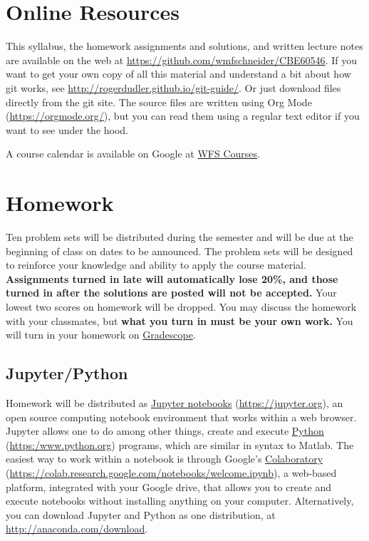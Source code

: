 \documentclass[11pt]{article}
\begin{document}
\section{Online Resources}
\label{sec:orgce3b4d6}
This syllabus, the homework assignments and solutions, and written lecture notes are available on the web at \url{https://github.com/wmfschneider/CBE60546}.  If you want to get your own copy of all this material and understand a bit about how git works, see \url{http://rogerdudler.github.io/git-guide/}.  Or just download files directly from the git site. The source files are written using Org Mode (\url{https://orgmode.org/}), but you can read them using a regular text editor if you want to see under the hood.

A course calendar is available on Google at \href{https://calendar.google.com/calendar/b/1?cid=NWJwN2pmMjI5bTdoYmFvM2R0cXM2NjYzOThAZ3JvdXAuY2FsZW5kYXIuZ29vZ2xlLmNvbQ}{WFS Courses}.
\section{Homework}
\label{sec:org49f998b}
Ten problem sets will be distributed during the semester and will be due at the beginning of class on dates to be announced. The problem sets will be designed to reinforce your knowledge and ability to apply the course material.  \textbf{Assignments turned in late will automatically lose 20\%, and those turned in after the solutions are posted will not be accepted.}  Your lowest two scores on homework will be dropped.  You may discuss the homework with your classmates, but \textbf{what you turn in must be your own work.} You will turn in your homework on \href{https://www.gradescope.com/courses/933965}{Gradescope}.
\subsection{Jupyter/Python}
\label{sec:org235db4b}
Homework will be distributed as \href{https://jupyter.org/}{Jupyter notebooks} (\url{https://jupyter.org}), an open source computing notebook environment that works within a web browser. Jupyter allows one to do among other things, create and execute \href{https://www.python.org/}{Python} (\url{https:/www.python.org}) programs, which are similar in syntax to Matlab. The easiest way to work within a notebook is through Google's \href{https://colab.research.google.com/notebooks/welcome.ipynb}{Colaboratory} (\url{https://colab.research.google.com/notebooks/welcome.ipynb}), a web-based platform, integrated with your Google drive, that allows you to create and execute notebooks without installing anything on your computer. Alternatively, you can download Jupyter and Python as one distribution, at \url{http://anaconda.com/download}. 
\end{document}
